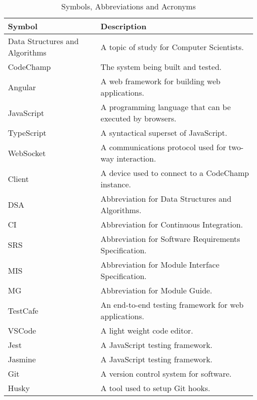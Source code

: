 \documentclass[12pt, titlepage]{article}
\begin{document}
\begin{table}[H]
\begin{center}
\begin{tabular}{|p{3cm}|p{9cm}|}
\hline
  \textbf{Symbol} & \textbf{Description}\\
  \hline
  Data Structures and Algorithms & A topic of study for Computer Scientists.\\
  \hline
  CodeChamp & The system being built and tested.\\
  \hline
  Angular & A web framework for building web applications.\\
  \hline
  JavaScript & A programming language that can be executed by browsers.\\
  \hline
  TypeScript & A syntactical superset of JavaScript.\\
  \hline
  WebSocket & A communications protocol used for two-way interaction.\\
  \hline
  Client & A device used to connect to a CodeChamp instance.\\
  \hline
  DSA & Abbreviation for Data Structures and Algorithms.\\
  \hline
  CI & Abbreviation for Continuous Integration.\\
  \hline
  SRS & Abbreviation for Software Requirements Specification.\\
  \hline
  MIS & Abbreviation for Module Interface Specification.\\
  \hline
  MG & Abbreviation for Module Guide.\\
  \hline
  TestCafe & An end-to-end testing framework for web applications. \\
  \hline
  VSCode & A light weight code editor.\\
  \hline
  Jest & A JavaScript testing framework.\\
  \hline
  Jasmine &  A JavaScript testing framework.\\
  \hline
  Git & A version control system for software.\\
  \hline
  Husky & A tool used to setup Git hooks.\\
  \hline
\end{tabular}
\end{center}
\caption{Symbols, Abbreviations and Acronyms}            

\end{table}

\newpage

\end{document}
